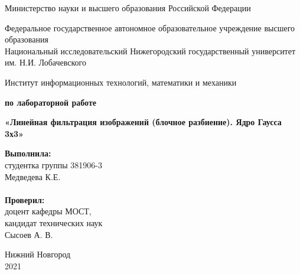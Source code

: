 \documentclass{report}
\begin{document}
\begin{titlepage}

\begin{center}
Министерство науки и высшего образования Российской Федерации
\end{center}

\begin{center}
Федеральное государственное автономное образовательное учреждение высшего образования \\
Национальный исследовательский Нижегородский государственный университет им. Н.И. Лобачевского
\end{center}

\begin{center}
Институт информационных технологий, математики и механики
\end{center}

\vspace{4em}

\begin{center}
\textbf{ по лабораторной работе} \\
\end{center}
\begin{center}
\textbf{\Large«Линейная фильтрация изображений (блочное разбиение). Ядро Гаусса 3х3»} \\
\end{center}

\vspace{4em}

\newbox{\lbox}
\newlength{\maxl}
\setlength{\maxl}{\wd\lbox}
\hfill\parbox{7cm}{
\hspace*{5cm}\hspace*{-5cm}\textbf{Выполнила:} \\ студентка группы 381906-3 \\ Медведева К.Е.\\
\\
\hspace*{5cm}\hspace*{-5cm}\textbf{Проверил:}\\ доцент кафедры МОСТ, \\ кандидат технических наук \\ Сысоев А. В.\\
}
\vspace{\fill}

\begin{center} Нижний Новгород \\ 2021 \end{center}

\end{titlepage}
\end{document}
